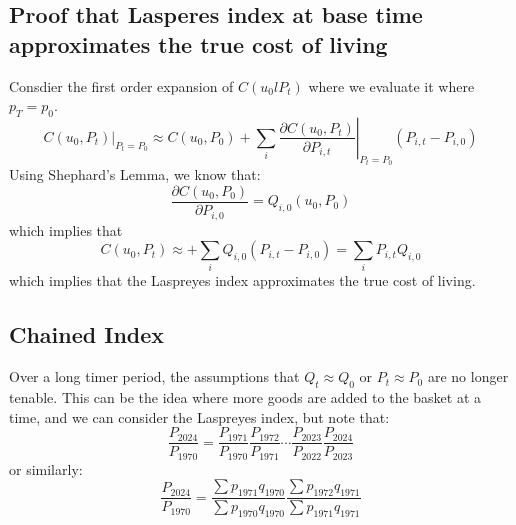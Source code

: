 \documentclass[11pt]{article}
\newtheorem{definition}{Definition}[section]
\newtheorem{note}{Note}[section]
\begin{document}
\subsection{Proof that Lasperes index at base time approximates the true cost of living}
Consdier the first order expansion of $C(u_0l P_t)$ where we evaluate it where $p_T = p_0$. 
\[
C(u_0, P_t)\big|_{P_t = P_0} \approx C(u_0, P_0) + \sum_i \left. \frac{\partial C(u_0, P_t)}{\partial P_{i,t}} \right|_{P_t = P_0} (P_{i,t} - P_{i,0})
\]
Using Shephard's Lemma, we know that:
\[
\frac{\partial C(u_0, P_0)}{\partial P_{i, 0}} = Q_{i,0}(u_0,P_0)
\]
which implies that 
\[
C(u_0, P_t) \approx + \sum_i Q_{i,0} (P_{i,t} - P_{i,0}) = \sum_i P_{i,t} Q_{i,0}
\]
which implies that the Laspreyes index approximates the true cost of living. 
\subsection{Chained Index}
Over a long timer period, the assumptions that $Q_t \approx Q_0$ or $P_t \approx P_0$ are no longer tenable. This can be the idea where more goods are added to the basket at a time, and we can consider the Laspreyes index, but note that:
\[
\frac{P_{2024}}{P_{1970}} = \frac{P_{1971}}{P_{1970}} \frac{P_{1972}}{P_{1971}} \cdots \frac{P_{2023}}{P_{2022}} \frac{P_{2024}}{P_{2023}}
\]
or similarly:
\[
\frac{P_{2024}}{P_{1970}} = \frac{\sum p_{1971}q_{1970}}{\sum p_{1970}q_{1970}} \frac{\sum p_{1972} q_{1971}}{\sum p_{1971} q_{1971}}
\]






\end{document}
